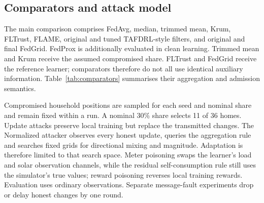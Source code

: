 \documentclass[preprint,12pt,a4paper]{elsarticle}
\begin{document}
\subsection{Comparators and attack model}
The main comparison comprises FedAvg, median, trimmed mean, Krum, FLTrust, FLAME, original and tuned TAFDRL-style filters, and original and final FedGrid. FedProx is additionally evaluated in clean learning. Trimmed mean and Krum receive the assumed compromised share. FLTrust and FedGrid receive the reference learner; comparators therefore do not all use identical auxiliary information. Table~\ref{tab:comparators} summarises their aggregation and admission semantics.

\begin{table}[htbp]
\centering\small
\caption{Comparator scope and admission semantics. Source algorithms are adapted to shared SAC parameter changes; original guarantees are not transferred to this setting.}
\label{tab:comparators}
\end{table}



Compromised household positions are sampled for each seed and nominal share and remain fixed within a run. A nominal 30\% share selects 11 of 36 homes. Update attacks preserve local training but replace the transmitted changes. The Normalized attacker observes every honest update, queries the aggregation rule and searches fixed grids for directional mixing and magnitude. Adaptation is therefore limited to that search space. Meter poisoning swaps the learner's load and solar observation channels, while the residual self-consumption rule still uses the simulator's true values; reward poisoning reverses local training rewards. Evaluation uses ordinary observations. Separate message-fault experiments drop or delay honest changes by one round.
\end{document}

